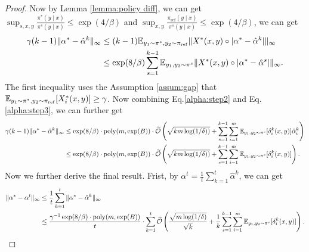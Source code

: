 \begin{proof}
    Now by Lemma \ref{lemma:policy diff}, we can get  $\sup_{s,x,y}\frac{\pi^*(y\mid x)}{\pi^s(y\mid x)} \le  \exp(4/\beta)$ and $\sup_{x,y}\frac{\pi_{\mathrm{ref}}(y\mid x)}{\pi^s(y\mid x)} \le \exp(4/\beta)$, we can get 
    \begin{align}
    \gamma(k-1) \|\alpha^* - \hat{\alpha}^{k}\|_\infty
        &\le (k-1) \mathbb{E}_{y_1\sim \pi^*,y_2\sim \pi_{\mathrm{ref}}}\|X^*(x,y)\circ|\alpha^* - \hat{\alpha}^k|\|_\infty\nonumber\\
        &\le  \exp(8/\beta)
        \sum_{s=1}^{k-1}\mathbb{E}_{y_1,y_2\sim \pi^s}\|X^*(x,y)\circ|\alpha^* - \hat{\alpha}^s|\|_\infty. \label{alpha:step3}
        \end{align}
The first inequality uses the Assumption \ref{assum:gap} that $\mathbb{E}_{y_1\sim \pi^*, y_2\sim \pi_{\mathrm{ref}}}[X_i^*(x,y)] \ge \gamma $. Now combining Eq.\eqref{alpha:step2} and Eq.\eqref{alpha:step3}, we can further get 
        \begin{align}
        \gamma(k-1)\|\alpha^* - \hat{\alpha}^k\|_\infty &\le  \exp(8/\beta)\cdot \mathrm{poly}(m, \exp(B))\cdot \widetilde{\mathcal{O}}\left(\sqrt{km\log (1/\delta))} +  \sum_{s=1}^{k-1}\sum_{i=1}^m \mathbb{E}_{y_1,y_2\sim \pi^s}[\delta_i^{k}(x,y)]\hat{\alpha}_i^k\right)\nonumber\\
        &\le \exp(8/\beta)\cdot \mathrm{poly}(m, \exp(B))\cdot \widetilde{\mathcal{O}}\left(\sqrt{km\log (1/\delta))} +  \sum_{s=1}^{k-1}\sum_{i=1}^m \mathbb{E}_{y_1,y_2\sim \pi^s}[\delta_i^{k}(x,y)]\right).\label{eq:estimate alpha step 1}
    \end{align}
    Now we further derive the  final result.
    Frist, by $\alpha^t = \frac{1}{t}\sum_{k=1}^t \hat{\alpha}^k$, we can get 
    \begin{align}
        \|\alpha^* - \alpha^t\|_\infty &\le \frac{1}{t}\sum_{k=1}^{t}\|\alpha^* - \hat{\alpha}^k\|_\infty\nonumber\\
        &\le \frac{\gamma^{-1}\exp(8/\beta)\cdot \mathrm{poly}(m,\exp(B))}{t}\cdot \sum_{k=1}^t\widetilde{\mathcal{O}}\left(\frac{\sqrt{m\log(1/\delta)}}{\sqrt{k}} + \frac{1}{k} \sum_{s=1}^{k-1}\sum_{i=1}^m \mathbb{E}_{y_1,y_2\sim \pi^s}[\delta_i^{k}(x,y)]\right).\label{eq:alpha1}
    \end{align}


\end{proof}
